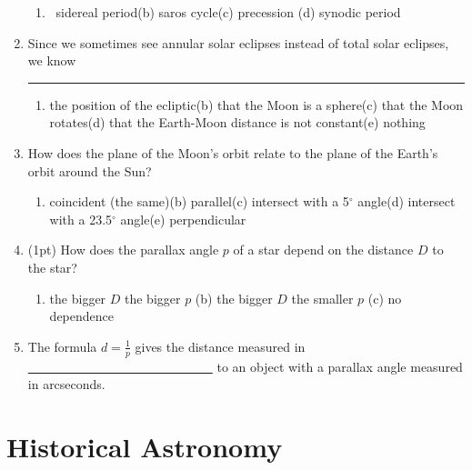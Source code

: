 \documentclass[12pt,thmsa]{article}
\begin{document}
\begin{enumerate}
\begin{enumerate}
\item  \ sidereal period\qquad (b) saros cycle\qquad (c) precession\qquad
(d) synodic period\qquad
\end{enumerate}

\item  Since we sometimes see annular solar eclipses instead of total solar
eclipses, we know \rule{0.6in}{0.01in}

\begin{enumerate}
\item  the position of the ecliptic\qquad (b) that the Moon is a
sphere\qquad (c) that the Moon rotates\qquad (d) that the Earth-Moon
distance is not constant\qquad (e) nothing
\end{enumerate}

\item  How does the plane of the Moon's orbit relate to the plane of the
Earth's orbit around the Sun?

\begin{enumerate}
\item  coincident (the same)\qquad (b) parallel\qquad (c) intersect with a 5$%
^{\circ }$ angle\qquad (d) intersect with a 23.5$^{\circ }$ angle\qquad (e)
perpendicular
\end{enumerate}

\item (1pt) How does the parallax angle $p$ of a star depend on the distance $D$
to the star?
\begin{enumerate}
\item the bigger $D$ the bigger $p$ \qquad (b) the bigger $D$ the smaller $p$
\qquad (c) no dependence
\end{enumerate}

\item The formula $d=\frac{1}{p}$ gives the distance
measured in \underline{~~~~~~~~~~~~~~~~~~~~~~~~~~~~~}
to an object with a parallax angle measured in arcseconds.
\end{enumerate}

\section{Historical Astronomy }
\end{document}
